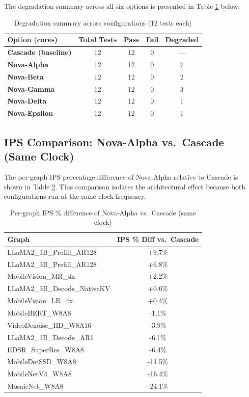 The degradation summary across all six options is presented in Table \ref{c5:degradation} below.

\begin{table}[htb]
\fontsize{10}{12}\selectfont
\centering
\caption{Degradation summary across configurations (12 tests each)}
\label{c5:degradation}
\begin{tabular}{|p{4cm}|c|c|c|c|}
	\hline
	\textbf{Option (cores)}& \textbf{Total Tests} & \textbf{Pass} & \textbf{Fail} & \textbf{Degraded}\\
	\hline
	\textbf{Cascade (baseline)}   & 12    & 12 &   0 & ---\\\hline
	\textbf{Nova-Alpha}&   12  & 12   & 0 & 7\\\hline
	\textbf{Nova-Beta} & 12 & 12&  0 & 2\\\hline
	\textbf{Nova-Gamma}    &12 & 12&  0 & 3\\\hline
	\textbf{Nova-Delta}&   12  & 12 & 0 & 1\\\hline
	\textbf{Nova-Epsilon}& 12  & 12   & 0 & 1\\
	\hline
\end{tabular}
\end{table}

\subsection{IPS Comparison: Nova-Alpha vs.\ Cascade (Same Clock)}
The per-graph IPS percentage difference of Nova-Alpha relative to Cascade is shown in Table \ref{c5:ipsdiff}. This comparison isolates the architectural effect because both configurations run at the same clock frequency.

\begin{table}[htb]
\fontsize{10}{12}\selectfont
\centering
\caption{Per-graph IPS \% difference of Nova-Alpha vs.\ Cascade (same clock)}
\label{c5:ipsdiff}
\begin{tabular}{|p{6cm}|c|}
	\hline
	\textbf{Graph}& \textbf{IPS \% Diff vs.\ Cascade}\\
	\hline
	LLaMA2\_1B\_Prefill\_AR128 & +9.7\%\\\hline
	LLaMA2\_3B\_Prefill\_AR128 & +6.8\%\\\hline
	MobileVision\_MR\_4x & +2.2\%\\\hline
	LLaMA2\_3B\_Decode\_NativeKV & +0.6\%\\\hline
	MobileVision\_LR\_4x & +0.4\%\\\hline
	MobileBERT\_W8A8 & -1.1\%\\\hline
	VideoDenoise\_HD\_W8A16 & -3.9\%\\\hline
	LLaMA2\_1B\_Decode\_AR1 & -6.1\%\\\hline
	EDSR\_SuperRes\_W8A8 & -6.4\%\\\hline
	MobileDetSSD\_W8A8 & -11.5\%\\\hline
	MobileNetV4\_W8A8 & -16.4\%\\\hline
	MosaicNet\_W8A8 & -24.1\%\\
	\hline
\end{tabular}
\end{table}

